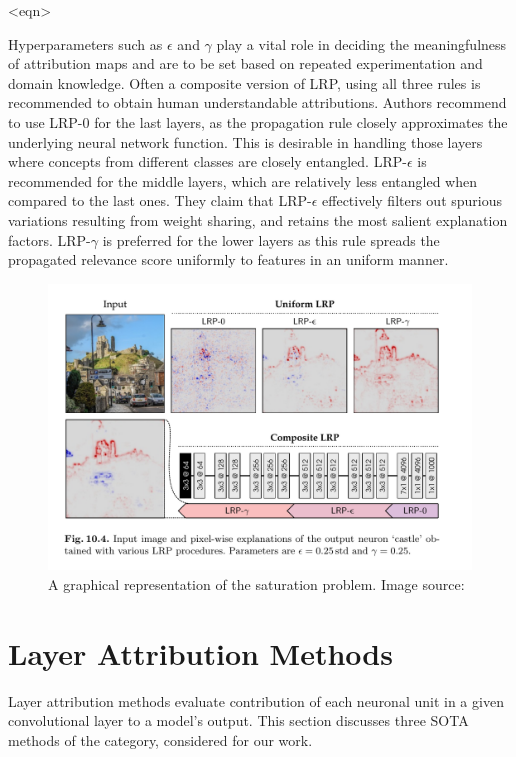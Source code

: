 \documentclass[../report.tex]{subfiles}
\begin{document}
<eqn>


Hyperparameters such as $\epsilon$ and $\gamma$ play a vital role in deciding the meaningfulness of attribution maps and are to be set based on repeated experimentation and domain knowledge. Often a composite version of LRP, using all three rules is recommended to obtain human understandable attributions.
Authors recommend to  use LRP-0 for the last layers, as the propagation rule closely approximates the underlying  neural network function. This is desirable in handling those layers where concepts from different classes are closely entangled. LRP-$\epsilon$ is recommended for the middle layers, which are relatively less entangled when compared to the last ones. They claim that LRP-$\epsilon$ effectively filters out spurious variations resulting from weight sharing, and retains the most salient explanation factors. LRP-$\gamma$ is preferred for the lower layers as this rule spreads the propagated relevance score uniformly to features in an uniform manner.

 \begin{figure}[H]
	\centering
	\includegraphics[scale=0.3]{images/chapter3/lrp.png}
	\caption{A graphical representation of the saturation problem. Image source: \cite{shrikumar2017learning}}
	\label{fig_deep_lift2}
\end{figure}




 
\section{Layer Attribution Methods}
Layer attribution methods evaluate contribution of each neuronal unit in a given convolutional layer to a model's output. This section discusses three SOTA methods of the category, considered for our work.
\end{document}
